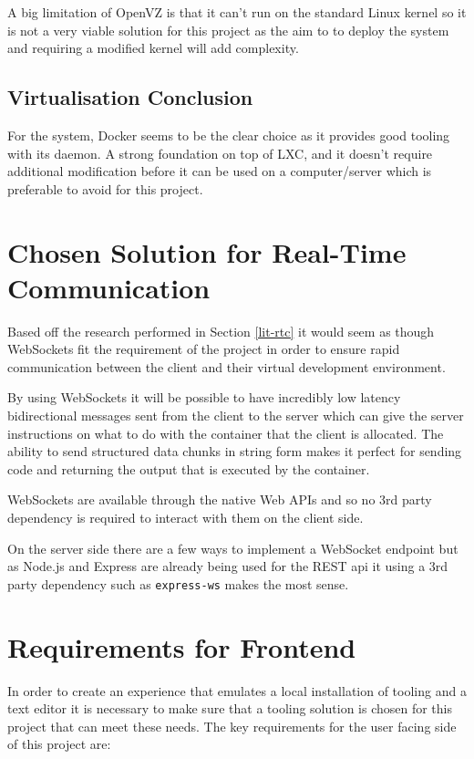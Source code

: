 A big limitation of OpenVZ is that it can't run on the standard Linux kernel so it is not a very viable solution for this project as the aim to to deploy the system and requiring a modified kernel will add complexity.

\subsection{Virtualisation Conclusion}

For the system, Docker seems to be the clear choice as it provides good tooling with its daemon. A strong foundation on top of LXC, and it doesn't require additional modification before it can be used on a computer/server which is preferable to avoid for this project.

\section{Chosen Solution for Real-Time Communication}

Based off the research performed in Section \ref{lit-rtc} it would seem as though WebSockets fit the requirement of the project in order to ensure rapid communication between the client and their virtual development environment.

By using WebSockets it will be possible to have incredibly low latency bidirectional messages sent from the client to the server which can give the server instructions on what to do with the container that the client is allocated. The ability to send structured data chunks in string form makes it perfect for sending code and returning the output that is executed by the container.

WebSockets are available through the native Web APIs and so no 3rd party dependency is required to interact with them on the client side.

On the server side there are a few ways to implement a WebSocket endpoint but as Node.js and Express are already being used for the REST api it using a 3rd party dependency such as \texttt{express-ws} makes the most sense.

\section{Requirements for Frontend}

In order to create an experience that emulates a local installation of tooling and a text editor it is necessary to make sure that a tooling solution is chosen for this project that can meet these needs. The key requirements for the user facing side of this project are:


